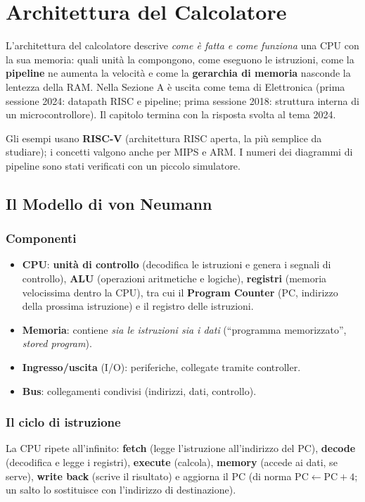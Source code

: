 \chapter{Architettura del Calcolatore}

L'architettura del calcolatore descrive \emph{come è fatta e come funziona} una CPU con la sua memoria: quali unità la compongono, come eseguono le istruzioni, come la \textbf{pipeline} ne aumenta la velocità e come la \textbf{gerarchia di memoria} nasconde la lentezza della RAM. Nella Sezione A è uscita come tema di Elettronica (prima sessione 2024: datapath RISC e pipeline; prima sessione 2018: struttura interna di un microcontrollore). Il capitolo termina con la risposta svolta al tema 2024.

Gli esempi usano \textbf{RISC-V} (architettura RISC aperta, la più semplice da studiare); i concetti valgono anche per MIPS e ARM. I numeri dei diagrammi di pipeline sono stati verificati con un piccolo simulatore.

\section{Il Modello di von Neumann}

\subsection{Componenti}
\begin{itemize}
    \item \textbf{CPU}: \textbf{unità di controllo} (decodifica le istruzioni e genera i segnali di controllo), \textbf{ALU} (operazioni aritmetiche e logiche), \textbf{registri} (memoria velocissima dentro la CPU), tra cui il \textbf{Program Counter} (PC, indirizzo della prossima istruzione) e il registro delle istruzioni.
    \item \textbf{Memoria}: contiene \emph{sia le istruzioni sia i dati} (``programma memorizzato'', \emph{stored program}).
    \item \textbf{Ingresso/uscita} (I/O): periferiche, collegate tramite controller.
    \item \textbf{Bus}: collegamenti condivisi (indirizzi, dati, controllo).
\end{itemize}

\subsection{Il ciclo di istruzione}
La CPU ripete all'infinito: \textbf{fetch} (legge l'istruzione all'indirizzo del PC), \textbf{decode} (decodifica e legge i registri), \textbf{execute} (calcola), \textbf{memory} (accede ai dati, se serve), \textbf{write back} (scrive il risultato) e aggiorna il PC (di norma $\text{PC}\leftarrow\text{PC}+4$; un salto lo sostituisce con l'indirizzo di destinazione).

